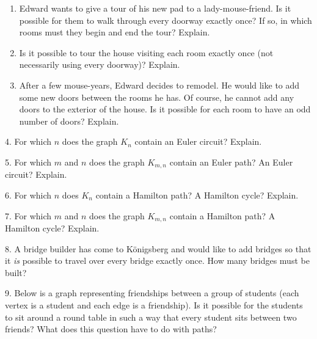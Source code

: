 \documentclass[12pt,]{book}
\theoremstyle{plain}
\theoremstyle{definition}
\theoremstyle{definition}
\theoremstyle{definition}
\numberwithin{equation}{chapter}
\begin{document}
\begin{exerciselist}
\par
\hypertarget{p-1702}{}%
\leavevmode%
\begin{enumerate}[label=(\alph*)]
\item\hypertarget{li-757}{}\hypertarget{p-1703}{}%
Edward wants to give a tour of his new pad to a lady-mouse-friend. Is it possible for them to walk through every doorway exactly once? If so, in which rooms must they begin and end the tour? Explain. %
\item\hypertarget{li-758}{}\hypertarget{p-1704}{}%
Is it possible to tour the house visiting each room exactly once (not necessarily using every doorway)? Explain. %
\item\hypertarget{li-759}{}\hypertarget{p-1705}{}%
After a few mouse-years, Edward decides to remodel. He would like to add some new doors between the rooms he has. Of course, he cannot add any doors to the exterior of the house. Is it possible for each room to have an odd number of doors? Explain. %
\end{enumerate}
%
\par\smallskip
\item[4.]\hypertarget{exercise-198}{}\hypertarget{p-1706}{}%
For which \(n\) does the graph \(K_n\) contain an Euler circuit? Explain.%
\par\smallskip
\item[5.]\hypertarget{exercise-199}{}\hypertarget{p-1708}{}%
For which \(m\) and \(n\) does the graph \(K_{m,n}\) contain an Euler path? An Euler circuit? Explain.%
\par\smallskip
\item[6.]\hypertarget{exercise-200}{}\hypertarget{p-1710}{}%
For which \(n\) does \(K_n\) contain a Hamilton path? A Hamilton cycle? Explain.%
\par\smallskip
\item[7.]\hypertarget{exercise-201}{}\hypertarget{p-1712}{}%
For which \(m\) and \(n\) does the graph \(K_{m,n}\) contain a Hamilton path? A Hamilton cycle? Explain.%
\par\smallskip
\item[8.]\hypertarget{exercise-202}{}\hypertarget{p-1714}{}%
A bridge builder has come to Königsberg and would like to add bridges so that it \emph{is} possible to travel over every bridge exactly once. How many bridges must be built?%
\par\smallskip
\item[9.]\hypertarget{exercise-203}{}\hypertarget{p-1716}{}%
Below is a graph representing friendships between a group of students (each vertex is a student and each edge is a friendship). Is it possible for the students to sit around a round table in such a way that every student sits between two friends? What does this question have to do with paths?%

\end{exerciselist}
\end{document}
